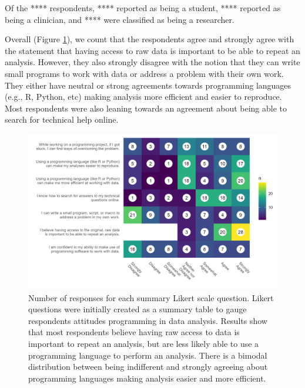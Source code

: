 \documentclass[020-persona\_validation.tex]{subfiles}
\begin{document}
        Of the **** respondents,
        **** reported as being a student,
        **** reported as being a clinician, and
        **** were classified as being a researcher.

        Overall (Figure \ref{fig:likert}),
        we count that the respondents agree and strongly agree with the statement
        that having access to raw data is important to be able to repeat an analysis.
        However, they also strongly disagree with the notion that
        they can write small programs to work with data or address a problem with their own work. %
        They either have neutral or strong agreements towards programming languages (e.g., R, Python, etc)
        making analysis more efficient and easier to reproduce.
        Most respondents were also leaning towards an agreement about being able to search for technical help online.

        \begin{figure}[htb]
            \centering
            \includegraphics[scale=0.5]{figs/020-persona/likert.png}
            \caption[Summary Likert scale responses]
            {Number of responses for each summary Likert scale question.
             Likert questions were initially created as a summary table to gauge respondents attitudes programming
             in data analysis.
             Results show that most respondents believe having raw access to data is important to repeat an analysis,
             but are less likely able to use a programming language to perform an analysis.
             There is a bimodal distribution between being indifferent and strongly agreeing
             about programming languages making analysis easier and more efficient.
            }
            \label{fig:likert}
        \end{figure}
\end{document}
